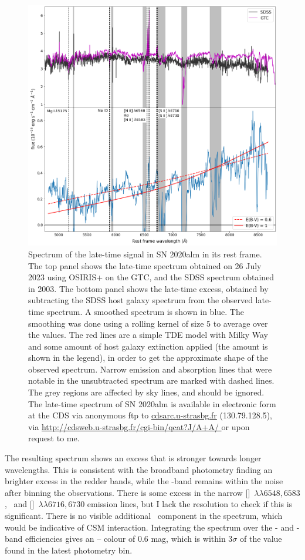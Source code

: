 \documentclass[a4paper,oneside,12pt, class=Latex/Classes/PhDthesisPSnPDF, crop=false]{standalone}
\begin{document}
\begin{figure}
 \centering
 \includegraphics[width=\textwidth]{../Images/chapter_3/spec_obj.png}
 \caption{Spectrum of the late-time signal in SN 2020alm in its rest frame. The top panel shows the late-time spectrum obtained on 26 July 2023 using OSIRIS+ on the GTC, and the SDSS spectrum obtained in 2003. The bottom panel shows the late-time excess, obtained by subtracting the SDSS host galaxy spectrum from the observed late-time spectrum. A smoothed spectrum is shown in blue. The smoothing was done using a rolling kernel of size 5 to average over the values. The red lines are a simple TDE model with Milky Way and some amount of host galaxy extinction applied (the amount is shown in the legend), in order to get the approximate shape of the observed spectrum. Narrow emission and absorption lines that were notable in the unsubtracted spectrum are marked with dashed lines. The grey regions are affected by sky lines, and should be ignored. The late-time spectrum of SN 2020alm is available in electronic form at the CDS via anonymous ftp to \url{cdsarc.u-strasbg.fr} (130.79.128.5), via \url{http://cdsweb.u-strasbg.fr/cgi-bin/qcat?J/A+A/ }or upon request to me.}
 \label{ZTF20aaifyfx_spec}
\end{figure}

The resulting spectrum shows an excess that is stronger towards longer wavelengths. This is consistent with the broadband photometry finding an brighter excess in the redder bands, while the \ztfg-band remains within the noise after binning the observations. There is some excess in the narrow [\NII]~${\lambda\lambda6548,6583}$, \Halpha~and [\SII]~${\lambda\lambda6716,6730}$ emission lines, but I lack the resolution to check if this is significant. There is no visible additional \Halpha~component in the spectrum, which would be indicative of CSM interaction. Integrating the spectrum over the \ztfr- and \ztfi-band efficiencies gives an \ztfr -- \ztfi colour of 0.6 mag, which is within $3\sigma$ of the value found in the latest photometry bin.
\end{document}
